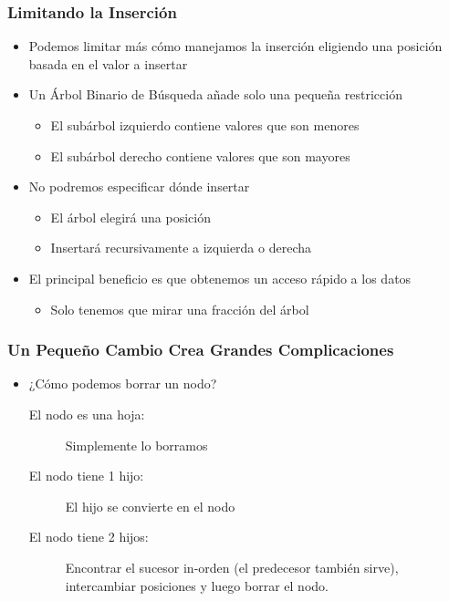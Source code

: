 \documentclass[11pt,handout]{beamer}
\begin{document}
\begin{frame}\frametitle{Limitando la Inserción}
\begin{itemize}
	\item Podemos limitar más cómo manejamos la inserción eligiendo una posición basada en el valor a insertar
	\item Un Árbol Binario de Búsqueda añade solo una pequeña restricción
	    \begin{itemize}
	    	\item El subárbol izquierdo contiene valores que son menores
	    	\item El subárbol derecho contiene valores que son mayores
	    \end{itemize}
	\item No podremos especificar dónde insertar
	    \begin{itemize}
	    	\item El árbol elegirá una posición
	    	\item Insertará recursivamente a izquierda o derecha
	    \end{itemize}
	\item El principal beneficio es que obtenemos un acceso rápido a los datos
	    \begin{itemize}
	    	\item Solo tenemos que mirar una fracción del árbol
	    \end{itemize}
\end{itemize}
\end{frame}

\begin{frame}\frametitle{Un Pequeño Cambio Crea Grandes Complicaciones}
\begin{itemize}
	\item ¿Cómo podemos borrar un nodo?
\begin{description}
	\item[El nodo es una hoja:] Simplemente lo borramos
	\item[El nodo tiene 1 hijo:] El hijo se convierte en el nodo
	\item[El nodo tiene 2 hijos:] Encontrar el sucesor in-orden (el predecesor también sirve), intercambiar posiciones y luego borrar el nodo.
\end{description}
\end{itemize}
\end{frame}
\end{document}
